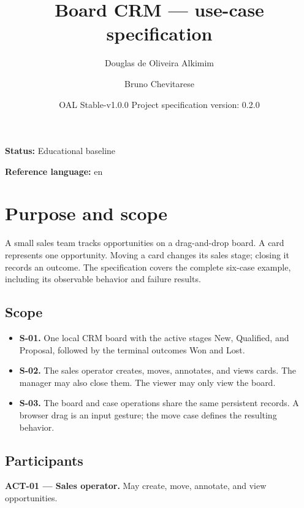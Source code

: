 \documentclass[10pt,a4paper]{article}
\begin{document}
\title{Board CRM --- use-case specification}

\author{Douglas de Oliveira Alkimim \and Bruno Chevitarese}

\date{OAL Stable-v1.0.0 \quad Project specification version: 0.2.0}

\maketitle

\textbf{Status:} Educational baseline

\textbf{Reference language:} en

\section{Purpose and scope}

A small sales team tracks opportunities on a drag-and-drop board. A card represents one opportunity. Moving a card changes its sales stage; closing it records an outcome. The specification covers the complete six-case example, including its observable behavior and failure results.

\subsection{Scope}

\begin{itemize}

\item \textbf{S-01.} One local CRM board with the active stages New, Qualified, and Proposal, followed by the terminal outcomes Won and Lost.

\item \textbf{S-02.} The sales operator creates, moves, annotates, and views cards. The manager may also close them. The viewer may only view the board.

\item \textbf{S-03.} The board and case operations share the same persistent records. A browser drag is an input gesture; the move case defines the resulting behavior.

\end{itemize}

\subsection{Participants}

\textbf{ACT-01 --- Sales operator.} May create, move, annotate, and view opportunities.
\end{document}
